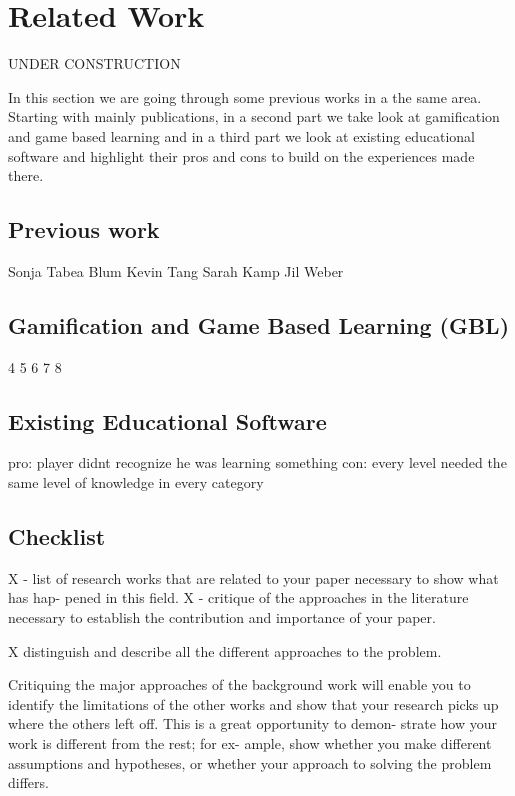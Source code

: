 
\setcounter{chapter}{1}

\chapter{Related Work}
\label{chap:relatedwork}
UNDER CONSTRUCTION

In this section we are going through some previous works in a the same area.
Starting with mainly publications, in a second part we take look at gamification
and game based learning and in a third part we look at existing educational software
and highlight their pros and cons to build on the experiences made there.

\section{Previous work}
Sonja Tabea Blum
Kevin Tang
Sarah Kamp
Jil Weber

\section{Gamification and Game Based Learning (GBL)}
4
5
6
7
8

\section{Existing Educational Software}

pro: player didnt recognize he was learning something
con: every level needed the same level of knowledge in every category


\section{Checklist}
X - list of research works that are related to your paper necessary to show what has hap-
pened in this field.
X - critique of the approaches in the literature necessary to establish the
contribution and importance of your paper.

X distinguish and describe all the different approaches to the problem.

Critiquing the major approaches of the background
work will enable you to identify the limitations of the
other works and show that your research picks up where
the others left off. This is a great opportunity to demon-
strate how your work is different from the rest; for ex-
ample, show whether you make different assumptions
and hypotheses, or whether your approach to solving the
problem differs.

